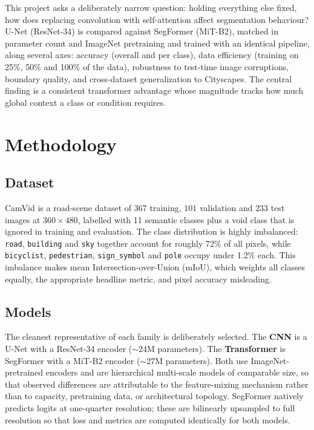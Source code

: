 \documentclass[11pt,a4paper]{article}
\begin{document}
This project asks a deliberately narrow question: holding everything else
fixed, how does replacing convolution with self-attention affect segmentation
behaviour? U-Net (ResNet-34) is compared against SegFormer (MiT-B2), matched in
parameter count and ImageNet pretraining and trained with an identical
pipeline, along several axes: accuracy (overall and per class), data efficiency
(training on 25\%, 50\% and 100\% of the data), robustness to test-time image
corruptions, boundary quality, and cross-dataset generalization to Cityscapes.
The central finding is a consistent transformer advantage whose magnitude
tracks how much global context a class or condition requires.

\section{Methodology}

\subsection{Dataset}

CamVid is a road-scene dataset of $367$ training, $101$ validation and $233$
test images at $360\times480$, labelled with 11 semantic classes plus a void
class that is ignored in training and evaluation. The class distribution is
highly imbalanced: \texttt{road}, \texttt{building} and \texttt{sky} together
account for roughly 72\% of all pixels, while \texttt{bicyclist},
\texttt{pedestrian}, \texttt{sign\_symbol} and \texttt{pole} occupy under 1.2\%
each. This imbalance makes mean Intersection-over-Union (mIoU), which weights
all classes equally, the appropriate headline metric, and pixel accuracy
misleading.

\subsection{Models}

The cleanest representative of each family is deliberately selected. The
\textbf{CNN} is a U-Net with a ResNet-34 encoder ($\sim$24M parameters). The
\textbf{Transformer} is SegFormer with a MiT-B2 encoder ($\sim$27M parameters).
Both use ImageNet-pretrained encoders and are hierarchical multi-scale models
of comparable size, so that observed differences are attributable to the
feature-mixing mechanism rather than to capacity, pretraining data, or
architectural topology. SegFormer natively predicts logits at one-quarter
resolution; these are bilinearly upsampled to full resolution so that loss and
metrics are computed identically for both models.
\end{document}
